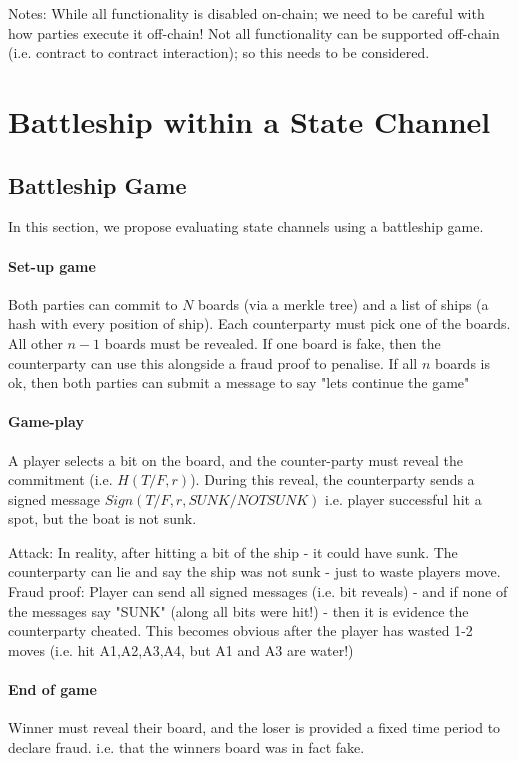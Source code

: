 \documentclass{llncs}
\begin{document}
Notes: While all functionality is disabled on-chain; we need to be careful with how parties execute it off-chain! Not all functionality can be supported off-chain (i.e. contract to contract interaction); so this needs to be considered. 

\section{Battleship within a State Channel} 

\subsection{Battleship Game} 
In this section, we propose evaluating state channels using a battleship game. 

\paragraph{Set-up game} Both parties can commit to $N$ boards (via a merkle tree) and a list of ships (a hash with every position of ship). Each counterparty must pick one of the boards. All other $n-1$ boards must be revealed. If one board is fake, then the counterparty can use this alongside a fraud proof to penalise. If all $n$ boards is ok, then both parties can submit a message to say "lets continue the game" 

\paragraph{Game-play} A player selects a bit on the board, and the counter-party must reveal the commitment (i.e. $H(T/F,r)$). During this reveal, the counterparty sends a signed message $Sign(T/F,r,SUNK/NOTSUNK)$ i.e. player successful hit a spot, but the boat is not sunk. 

Attack: In reality, after hitting a bit of the ship - it could have sunk. The counterparty can lie and say the ship was not sunk - just to waste players move. 
Fraud proof: Player can send all signed messages (i.e. bit reveals) - and if none of the messages say "SUNK" (along all bits were hit!) - then it is evidence the counterparty cheated. This becomes obvious after the player has wasted 1-2 moves (i.e. hit A1,A2,A3,A4, but A1 and A3 are water!) 

\paragraph{End of game} Winner must reveal their board, and the loser is provided a fixed time period to declare fraud. i.e. that the winners board was in fact fake. 
\end{document}
